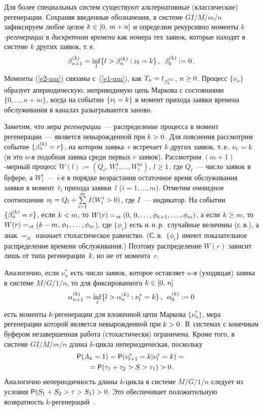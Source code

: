 \begin{multicols}{2}
Для  более специальных систем существуют альтернативные (классические)
регенерации. Со\-хра\-няя введенные обозначения, в сис\-те\-ме $GI/M/m/n$ зафиксируем
любое целое $k\hm\in [0,\, m+n]$ и определим рекурсивно моменты  {\it $k$-ре\-ге\-не\-ра\-ции} 
в {\it дискретном времени}  как номера тех заявок, которые
находят  в системе $k$ других заявок, т.\,е.\ 
 \begin{equation}
\beta^{(k)}_{n+1}=\inf_l\{l>\beta^{(k)}_{n}: \nu_l=k\}\,, \enskip
\beta^{(k)}_0:=0\,.
\label{e2-mn}
\end{equation}
Моменты  (\ref{e2-mn}) связаны с~(\ref{e1-mn}), как
$T_n\hm=t_{\beta^{(0)}_n}$, $n\hm\ge0$. Процесс $\{\nu_n\}$ образует апериодическую,
неприводимую цепь Маркова с  состояниями $\{0,\ldots,n+m\}$, когда на 
событии $\{\nu_l\hm=k \}$ в момент прихода   заявки
времена обслуживания  в каналах  разыгрываются заново. 

Заметим, что
{\it мера регенерации}~--- распределение процесса в момент
регенерации~--- является невырожденной при  $k\hm>0$. Для пояснения
рассмотрим событие $\{\beta^{(k)}_{n}\hm=r\}$, на котором заявка~$r$
встречает $k$ других заявок, т.\,е.\ $\nu_r\hm=k$ (и это $n$-я подобная
заявка среди первых $r$ заявок). Рассмотрим $(m+1)$-мер\-ный процесс
$W(l):=(Q_l,\, W_l^1, \ldots, W_l^m)$, $l\hm\ge1$, где $Q_l$~--- число
заявок  в буфере, а $W_l^i$~--- $i$-е в порядке возрастания
остаточное время обслуживания заявки  в момент~$t_l$ прихода заявки~$l$
($i=1,\dots,m$). Отметим очевидное соотношение
$\nu_l\hm=Q_l\hm+\sum\limits_{i=1}^mI(W_l^i>0)$, где $I$~--- индикатор. На событии
$\{\beta^{(k)}_{n}\hm=r\}$, если $k\hm< m$, то
$W(r)\hm{=}_{\!\mathrm{st}}\;(0,\,0,\ldots,\phi_{k+1}, \ldots, \phi_m)$, а если $k\hm\ge m$, 
то $W(r)\hm{=}_{\!\mathrm{st}}\;(k-m,\,\phi_1, \ldots, \phi_m$), где $\{\phi_i\}$
есть н.\,о.\,р.\   случайные величины (с.\,в.), а знак ${=}_{\mathrm{st}}$ означает 
стохастическое равенство. (С.\,в.~$\{\phi_i\}$  имеют показательное распределение    времени
обслуживания.) Поэтому распределение $W(r)$ зависит лишь от типа регенерации~$k$, но не от момента~$r$.

Аналогично, если $\nu_n^*$ есть число заявок, которое оставляет $n$-я
(уходящая)  заявка в системе  $M/G/1/n$,  то для фиксированного $k\hm\in[0,\,n]$
 \begin{equation*}
\alpha^{(k)}_{n+1}=\inf\limits_l\{l>\alpha^{(k)}_{n}: \nu_l^*=k\}\,,
\enskip\alpha^{(k)}_{0}:=0
 \end{equation*}
 есть  моменты $k$-регенерации для вложенной  цепи Маркова $\{\nu_n^*\}$, 
 мера регенерации которой   является невырожденной при $k\hm>0$.
 В~сис\-те\-мах с конечным буфером   незавершенная работа  (стохастически) ограничена.
Кроме того, в системе $GI/M/m/n$  длина $k$-цик\-ла непериодическая, поскольку
\begin{multline*}
{\sf P}(A_k=1)={\sf P}(\nu^*_{l+1}=k|\nu^*_l=k)={}\\
{}={\sf P}(\tau_1+\tau_2>S>\tau_1)>0\,.
\end{multline*}
Аналогично непериодичность длины $k$-цик\-ла в сис\-те\-ме $M/G/1/n$
следует из условия $\p(S_1+S_2>\tau\hm>S_1)\hm>0$.  Это обеспечивает положительную
 возвратность  $k$-ре\-ге\-не\-ра\-ций~\cite{MorozovDelgado}.
 

\end{multicols}

